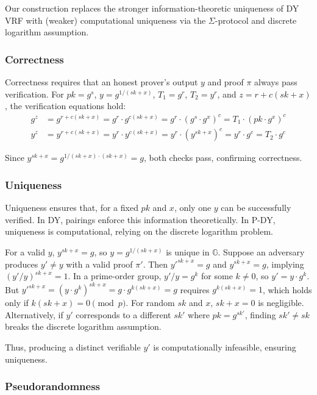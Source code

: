 Our construction replaces the stronger information-theoretic uniqueness of DY VRF with (weaker) computational uniqueness via the $\Sigma$-protocol and discrete logarithm assumption.


\subsubsection{Correctness}

Correctness requires that an honest prover’s output $y$ and proof $\pi$ always pass verification. For $pk = g^{s}$, $y = g^{1/(sk + x)}$, $T_1 = g^r$, $T_2 = y^r$, and $z = r + c(sk + x)$, the verification equations hold:
\begin{align*}
g^z &= g^{r + c(sk + x)} = g^r \cdot g^{c(sk + x)} = g^r \cdot (g^{s} \cdot g^x)^c = T_1 \cdot (pk \cdot g^x)^c \\
y^z &= y^{r + c(sk + x)} = y^r \cdot y^{c(sk + x)} = y^r \cdot (y^{sk + x})^c = y^r \cdot g^c = T_2 \cdot g^c
\end{align*}

Since $y^{sk + x} = g^{1/(sk + x) \cdot (sk + x)} = g$, both checks pass, confirming correctness.

\subsubsection{Uniqueness}

Uniqueness ensures that, for a fixed $pk$ and $x$, only one $y$ can be successfully verified. In DY, pairings enforce this information theoretically. In P-DY, uniqueness is computational, relying on the discrete logarithm problem.

For a valid $y$, $y^{sk + x} = g$, so $y = g^{1/(sk + x)}$ is unique in $\mathbb{G}$. Suppose an adversary produces $y' \neq y$ with a valid proof $\pi'$. Then $y'^{sk + x} = g$ and $y^{sk + x} = g$, implying $(y'/y)^{sk + x} = 1$. In a prime-order group, $y'/y = g^k$ for some $k \neq 0$, so $y' = y \cdot g^k$. But $y'^{sk + x} = (y \cdot g^k)^{sk + x} = g \cdot g^{k(sk + x)} = g$ requires $g^{k(sk + x)} = 1$, which holds only if $k(sk + x) = 0 \pmod{p}$. For random $sk$ and $x$, $sk + x = 0$ is negligible. Alternatively, if $y'$ corresponds to a different $sk'$ where $pk = g^{sk'}$, finding $sk' \neq sk$ breaks the discrete logarithm assumption.

Thus, producing a distinct verifiable $y'$ is computationally infeasible, ensuring uniqueness.

\subsubsection{Pseudorandomness}


